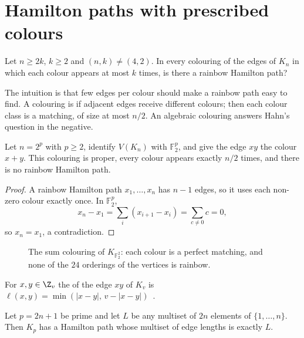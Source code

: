 \section{Hamilton paths with prescribed colours}\label{sec:hamilton-paths}


\begin{problem}\label{prob:hahn}
Let $n\geq2k$, $k\geq2$ and $(n,k)\neq(4,2)$. In every colouring of the edges of $K_n$ in which each colour appears at most $k$ times, is there a rainbow Hamilton path?
\end{problem}

The intuition is that few edges per colour should make a rainbow path easy to find. A colouring is  if adjacent edges receive different colours; then each colour class is a matching, of size at most $n/2$. An algebraic colouring answers Hahn's question in the negative.

\begin{theorem}\label{thm:mm}
Let $n=2^p$ with $p\geq2$, identify $V(K_n)$ with $\mathbb F_2^p$, and give the edge $xy$ the colour $x+y$. This colouring is proper, every colour appears exactly $n/2$ times, and there is no rainbow Hamilton path.
\end{theorem}

\begin{proof}
A rainbow Hamilton path $x_1,\dots,x_n$ has $n-1$ edges, so it uses each non-zero colour exactly once. In $\mathbb F_2^p$,
\[
x_n-x_1=\sum_{i}(x_{i+1}-x_i)=\sum_{c\neq0}c=0,
\]
so $x_n=x_1$, a contradiction.
\end{proof}

\begin{figure}[ht]
\centering

\caption{The sum colouring of $K_{\mathbb F_2^2}$: each colour is a perfect matching, and none of the $24$ orderings of the vertices is rainbow.}
\label{fig:maamoun-meyniel}
\end{figure}


For $x,y\in\Z_v$ the  of the edge $xy$ of $K_v$ is $\ell(x,y)=\min(|x-y|,\,v-|x-y|)$~\cite[\S1]{hr09}.

\begin{conjecture}\label{conj:buratti}
Let $p=2n+1$ be prime and let $L$ be any multiset of $2n$ elements of $\{1,\dots,n\}$. Then $K_p$ has a Hamilton path whose multiset of edge lengths is exactly $L$.
\end{conjecture}

